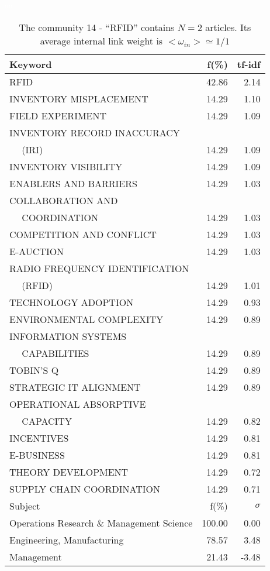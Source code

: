 \documentclass[a4paper,11pt]{report}
\begin{document}
\begin{landscape}
\clearpage

\begin{table}[!ht]
\caption{The community 14 - ``RFID'' contains $N = 2$ articles. Its average internal link weight is $<\omega_{in}> \simeq 1/1$ }
\textcolor{white}{aa}\\
{\scriptsize\begin{tabular}{|l r  r|}
\hline
Keyword & f(\%) & tf-idf \\
\hline
RFID & 42.86 & 2.14\\
INVENTORY MISPLACEMENT & 14.29 & 1.10\\
FIELD EXPERIMENT & 14.29 & 1.09\\
INVENTORY RECORD INACCURACY &  &\\
$\quad$ (IRI) & 14.29 & 1.09\\
INVENTORY VISIBILITY & 14.29 & 1.09\\
ENABLERS AND BARRIERS & 14.29 & 1.03\\
COLLABORATION AND &  &\\
$\quad$ COORDINATION & 14.29 & 1.03\\
COMPETITION AND CONFLICT & 14.29 & 1.03\\
E-AUCTION & 14.29 & 1.03\\
RADIO FREQUENCY IDENTIFICATION &  &\\
$\quad$ (RFID) & 14.29 & 1.01\\
TECHNOLOGY ADOPTION & 14.29 & 0.93\\
ENVIRONMENTAL COMPLEXITY & 14.29 & 0.89\\
INFORMATION SYSTEMS &  &\\
$\quad$ CAPABILITIES & 14.29 & 0.89\\
TOBIN'S Q & 14.29 & 0.89\\
STRATEGIC IT ALIGNMENT & 14.29 & 0.89\\
OPERATIONAL ABSORPTIVE &  &\\
$\quad$ CAPACITY & 14.29 & 0.82\\
INCENTIVES & 14.29 & 0.81\\
E-BUSINESS & 14.29 & 0.81\\
THEORY DEVELOPMENT & 14.29 & 0.72\\
SUPPLY CHAIN COORDINATION & 14.29 & 0.71\\
\hline
\hline
Subject & f(\%) & $\sigma$\\
\hline
Operations Research \& Management Science & 100.00 & 0.00\\
Engineering, Manufacturing & 78.57 & 3.48\\
Management & 21.43 & -3.48\\

\end{tabular}}
\end{table}
\end{landscape}
\end{document}
